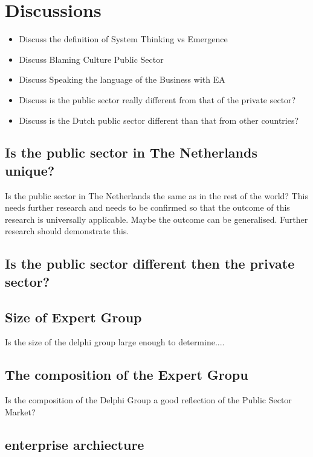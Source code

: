 \section{Discussions}
\label{sec:discussions}

\begin{itemize}
	\item{Discuss the definition of System Thinking vs Emergence}
	\item{Discuss Blaming Culture Public Sector}
	\item{Discuss Speaking the language of the Business with EA}
	\item{Discuss is the public sector really different from that of the private sector?}
	\item{Discuss is the Dutch public sector different than that from other countries?}
\end{itemize}

\subsection{Is the public sector in The Netherlands unique?}
\label{sub:discussionpublicsector}
Is the public sector in The Netherlands the same as in the rest of the world? This needs further research and needs to be confirmed so that the outcome of this research is universally applicable. Maybe the outcome can be generalised. Further research should demonstrate this.

\subsection{Is the public sector different then the private sector?}
\label{sub:discussionpublicvsprivate}


\subsection{Size of Expert Group}
\label{sub:discussionsizeofeg}
Is the size of the delphi group large enough to determine....
\subsection{The composition of the Expert Gropu}
\label{sub:compositionofeg}
Is the composition of the Delphi Group a good reflection of the Public Sector Market?

\subsection{enterprise archiecture}

